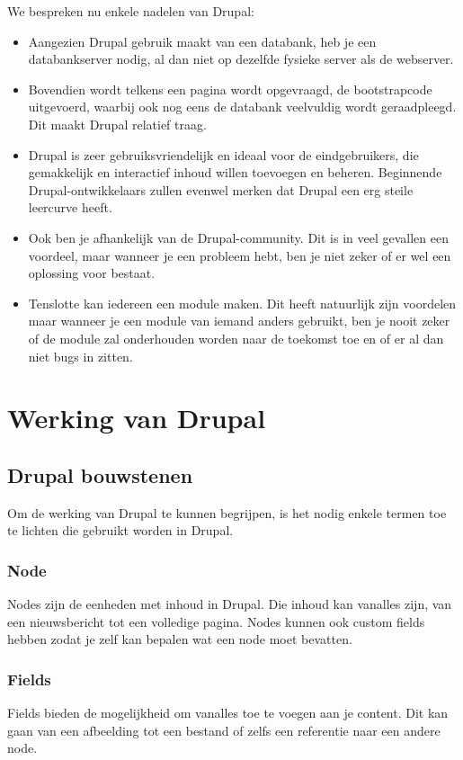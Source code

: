 We bespreken nu enkele nadelen van Drupal:
\begin{itemize}
\item Aangezien Drupal gebruik maakt van een databank, heb je een databankserver nodig, al dan niet op dezelfde fysieke server als de webserver.
\item Bovendien wordt telkens een pagina wordt opgevraagd, de bootstrapcode uitgevoerd, waarbij ook nog eens de databank veelvuldig wordt geraadpleegd. 
Dit maakt Drupal relatief traag.
\item Drupal is zeer gebruiksvriendelijk en ideaal voor de eindgebruikers, die gemakkelijk en interactief inhoud willen toevoegen en beheren. 
Beginnende Drupal-ontwikkelaars zullen evenwel merken dat Drupal een erg steile leercurve heeft.
\item Ook ben je afhankelijk van de Drupal-community. Dit is in veel gevallen een voordeel, maar wanneer je een probleem hebt, ben je niet zeker of er wel een oplossing voor bestaat.
\item Tenslotte kan iedereen een module maken. Dit heeft natuurlijk zijn voordelen maar wanneer je een module van iemand anders gebruikt, ben je nooit zeker of de module zal onderhouden worden naar de toekomst toe en of er al dan niet bugs in zitten.
\end{itemize}

\section{Werking van Drupal}

\subsection{Drupal bouwstenen}

Om de werking van Drupal te kunnen begrijpen, is het nodig enkele termen toe te lichten die gebruikt worden in Drupal.

\subsubsection{Node}
Nodes zijn de eenheden met inhoud in Drupal. Die inhoud kan vanalles zijn, van een nieuwsbericht tot een volledige pagina. Nodes kunnen ook custom fields hebben zodat je zelf kan bepalen wat een node moet bevatten.

\subsubsection{Fields}
Fields bieden de mogelijkheid om vanalles toe te voegen aan je content. Dit kan gaan van een afbeelding tot een bestand of zelfs een referentie naar een andere node.

